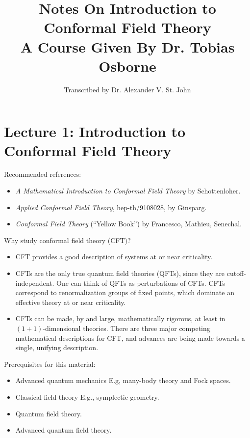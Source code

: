 \documentclass[10pt]{article}
\title{Notes On Introduction to Conformal Field Theory \\ A Course Given By Dr. Tobias Osborne}
\author{Transcribed by Dr. Alexander V. St. John}
\begin{document}
\maketitle

\clearpage

\section*{Lecture 1: Introduction to Conformal Field Theory}
\label{sec: lec1}

\noindent Recommended references:

\begin{itemize}
\item \textit{A Mathematical Introduction to Conformal Field Theory} by Schottenloher.
\item \textit{Applied Conformal Field Theory}, hep-th/9108028, by Ginsparg.
\item \textit{Conformal Field Theory} (``Yellow Book'') by Francesco, Mathieu, Senechal.
\end{itemize}

\noindent Why study conformal field theory (CFT)?

\begin{itemize}
\item CFT provides a good description of systems at or near criticality.
\item CFTs are the only true quantum field theories (QFTs), since they are cutoff-independent. One can think of QFTs as perturbations of CFTs. CFTs correspond to renormalization groups of fixed points, which dominate an effective theory at or near criticality.
\item CFTs can be made, by and large, mathematically rigorous, at least in $(1+1)$-dimensional theories. There are three major competing mathematical descriptions for CFT, and advances are being made towards a single, unifying description.
\end{itemize}

\noindent Prerequisites for this material:

\begin{itemize}
\item Advanced quantum mechanics
	\subitem E.g, many-body theory and Fock spaces.
\item Classical field theory
	\subitem E.g., symplectic geometry.
\item Quantum field theory.
\item Advanced quantum field theory.
\end{itemize}
\end{document}
